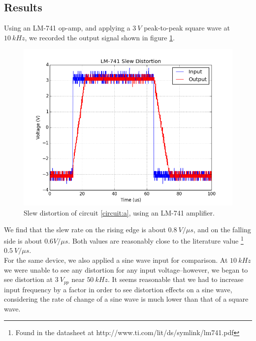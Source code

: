 \documentclass[11pt]{article}
\begin{document}
\subsection{Results}

Using an LM-741 op-amp, and applying a $3\ V$ peak-to-peak square wave at $10\ kHz$, we recorded the output signal shown in figure \ref{fig:A-1}.\\

\begin{figure}[H]
    \centering
    \includegraphics[scale=0.6]{Plots/figA-1.png}
    \caption{Slew distortion of circuit \ref{circuit:a}, using an LM-741 amplifier.}
    \label{fig:A-1}
\end{figure}

We find that the slew rate on the rising edge is about $0.8\ V / \mu s$, and on the falling side is about $0.6 V / \mu s$. Both values are reasonably close to the literature value \footnote{Found in the datasheet at http://www.ti.com/lit/ds/symlink/lm741.pdf} $0.5\ V / \mu s$.\\

For the same device, we also applied a sine wave input for comparison. At $10\ kHz$ we were unable to see any distortion for any input voltage--however, we began to see distortion at $3\ V_{pp}$ near $50\ kHz$. It seems reasonable that we had to increase input frequency by a factor in order to see distortion effects on a sine wave, considering the rate of change of a sine wave is much lower than that of a square wave.\\ 
\end{document}
